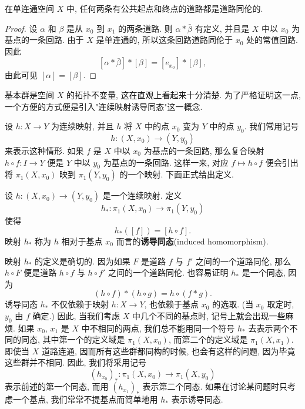 \begin{lemma}
\label{lemma:ch09-sec52-52-3}
在单连通空间 $X$ 中, 任何两条有公共起点和终点的道路都是道路同伦的.
\end{lemma}

\begin{proof}
设 $\alpha$ 和 $\beta$ 是从 $x_0$ 到 $x_1$ 的两条道路. 则 $\alpha*\bar{\beta}$ 有定义, 并且是 $X$ 中以 $x_0$ 为基点的一条回路. 由于 $X$ 是单连通的, 所以这条回路道路同伦于 $x_0$ 处的常值回路. 因此
\[
[\alpha*\bar{\beta}]*[\beta]=[e_{x_{0}}]*[\beta],
\]
由此可见 $[\alpha]=[\beta]$.
\end{proof}

基本群是空间 $X$ 的拓扑不变量, 这在直观上看起来十分清楚. 为了严格证明这一点, 一个方便的方式便是引入"连续映射诱导同态"这一概念.

设 $h\colon X\to Y$ 为连续映射, 并且 $h$ 将 $X$ 中的点 $x_0$ 变为 $Y$ 中的点 $y_0$. 我们常用记号
\[
h\colon(X,x_{0})\longrightarrow(Y,y_{0})
\]
来表示这种情形. 如果 $f$ 是 $X$ 中以 $x_0$ 为基点的一条回路, 那么复合映射 $h\circ f\colon I\to Y$ 便是 $Y$ 中以 $y_0$ 为基点的一条回路. 这样一来, 对应 $f\mapsto h\circ f$ 便会引出将 $\pi_1(X,x_0)$ 映到 $\pi_1(Y,y_0)$ 的一个映射. 下面正式给出定义.

\begin{definition}[诱导同态]
\label{definition:ch09-sec52-induced}
设 $h\colon(X,x_0)\to(Y,y_0)$ 是一个连续映射. 定义
\[
h_{*}\colon\pi_{1}(X,x_{0})\longrightarrow\pi_{1}(Y,y_{0})
\]
使得
\[
h_{*}([f])=[h\circ f].
\]
映射 $h_*$ 称为 $h$ 相对于基点 $x_0$ 而言的\textbf{诱导同态}(induced homomorphism).
\end{definition}

映射 $h_*$ 的定义是确切的. 因为如果 $F$ 是道路 $f$ 与 $f'$ 之间的一个道路同伦, 那么 $h\circ F$ 便是道路 $h\circ f$ 与 $h\circ f'$ 之间的一个道路同伦. 也容易证明 $h_*$ 是一个同态, 因为
\[
(h\circ f)*(h\circ g)=h\circ(f*g).
\]
诱导同态 $h_*$ 不仅依赖于映射 $h\colon X\to Y$, 也依赖于基点 $x_0$ 的选取. (当 $x_0$ 取定时, $y_0$ 由 $f$ 确定.) 因此, 当我们考虑 $X$ 中几个不同的基点时, 记号上就会出现一些麻烦. 如果 $x_0$, $x_1$ 是 $X$ 中不相同的两点, 我们总不能用同一个符号 $h_*$ 去表示两个不同的同态, 其中第一个的定义域是 $\pi_1(X,x_0)$, 而第二个的定义域是 $\pi_1(X,x_1)$. 即使当 $X$ 道路连通, 因而所有这些群都同构的时候, 也会有这样的问题, 因为毕竟这些群并不相同. 因此, 我们将采用记号
\[
(h_{x_{0}})_{*}\colon\pi_{1}(X,x_{0})\longrightarrow\pi_{1}(X,y_{0})
\]
表示前述的第一个同态, 而用 $(h_{x_1})_*$ 表示第二个同态. 如果在讨论某问题时只考虑一个基点, 我们常常不提基点而简单地用 $h_*$ 表示诱导同态.

